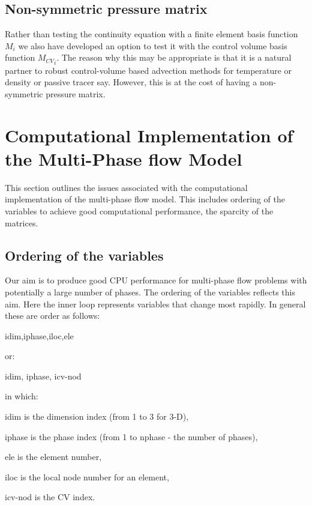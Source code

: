 \subsection{Non-symmetric pressure matrix}
Rather than testing the continuity equation with a finite element basis 
function $M_i$ we also have developed an option to test it with the 
control volume basis function ${M_{CV}}_i$. The reason why this may be appropriate 
is that it is a natural partner to robust control-volume based 
advection methods for temperature or density or passive tracer say. 
However, this is at the cost of having a non-symmetric pressure matrix. 




\pagebreak



\section{Computational Implementation of the Multi-Phase flow Model}
\label{Computational Implementation} 

This section outlines the issues associated with the 
computational implementation of the multi-phase flow model. 
This includes ordering of the variables to achieve good computational 
performance, the sparcity of the matrices. 

\subsection{Ordering of the variables}
\label{Ordering} 
Our aim is to produce good CPU performance for multi-phase flow 
problems with potentially a large number of phases. The ordering of 
the variables reflects this aim. Here the inner loop represents variables that 
change most rapidly. 
In general these are order as follows: 

\par\noindent
idim,iphase,iloc,ele

\par\noindent
or:


\par\noindent
idim, iphase, icv-nod

\par\noindent
in which:
\par\noindent
 idim is the dimension index (from 1 to 3 for 3-D), 
\par\noindent
iphase is the phase index (from 1 to nphase - the number of phases), 
\par\noindent
ele is the element number, 
\par\noindent
iloc is the local node number for an element, 
\par\noindent
icv-nod is the CV index.

